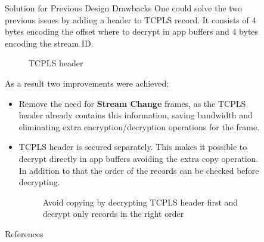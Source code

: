 \documentclass[final]{beamer}
\newlength{\sepwidth}
\newlength{\colwidth}
\newcommand{\separatorcolumn}{\begin{column}{\sepwidth}\end{column}}
\begin{document}
\begin{frame}[t]
\begin{columns}[t]
\begin{column}{\colwidth}
      \end{column}

      \separatorcolumn

      \begin{column}{\colwidth}

        \begin{block}{Solution for Previous Design Drawbacks}
          One could solve the two previous issues by adding a header to TCPLS record.
          It consists of 4 bytes encoding the offset where to decrypt in app buffers and 4 bytes encoding the stream ID.
          \begin{figure}
            \centering
            
            \caption{TCPLS header}
            \label{fig:header}
          \end{figure}
          As a result two improvements were achieved:
          \begin{itemize}
            \item Remove the need for \textbf{Stream Change} frames,
            as the TCPLS header already contains this information,
            saving bandwidth and eliminating extra encryption/decryption operations for the frame.
            \item TCPLS header is secured separately.
            This makes it possible to decrypt directly in app buffers avoiding the extra copy operation.
            In addition to that the order of the records can be checked before decrypting.
            \begin{figure}
            \centering
            
            \caption{Avoid copying by decrypting TCPLS header first and decrypt only records in the right order}
            \label{fig:dec_hdr}
          \end{figure}
          \end{itemize}

       \end{block}

        \begin{block}{References}

          \nocite{*}
          \footnotesize{}

        \end{block}

      \end{column}

      \separatorcolumn
    \end{columns}
  \end{frame}
\end{document}
